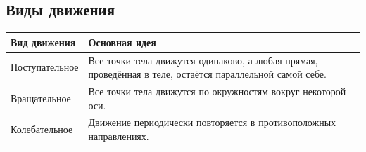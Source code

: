 \documentclass[a4paper,12pt]{article}
\begin{document}
\subsection*{Виды движения}

\begin{tabularx}{\linewidth}{@{}lX@{}}
\toprule
Вид движения & Основная идея\\
\midrule
Поступательное &
Все точки тела движутся одинаково, а любая прямая,
проведённая в теле, остаётся параллельной самой себе.\\

Вращательное &
Все точки тела движутся по окружностям вокруг некоторой оси.\\

Колебательное &
Движение периодически повторяется в противоположных направлениях.\\
\bottomrule
\end{tabularx}

\vspace{0.7cm}
\end{document}
